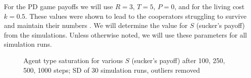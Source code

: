 \documentclass[english]{article}
\begin{document}
For the PD game payoffs we will use $R = 3$, $T = 5$, $P = 0$,
and for the living cost $k = 0.5$.
These values were shown to lead to the cooperators struggling to survive
and maintain their numbers \citep{smaldino}.
We will determine the value for $S$ (sucker's payoff) from the simulations.
Unless otherwise noted, we will use these parameters for all simulation runs.

\begin{figure}[!ht]
  \centering
  \caption{Agent type saturation for various $S$ (sucker's payoff) after 100, 250, 500, 1000 steps; SD of 30 simulation runs, outliers removed}
  \label{fig:agent_sat/S-memory0gossip0}
\end{figure}
\end{document}
